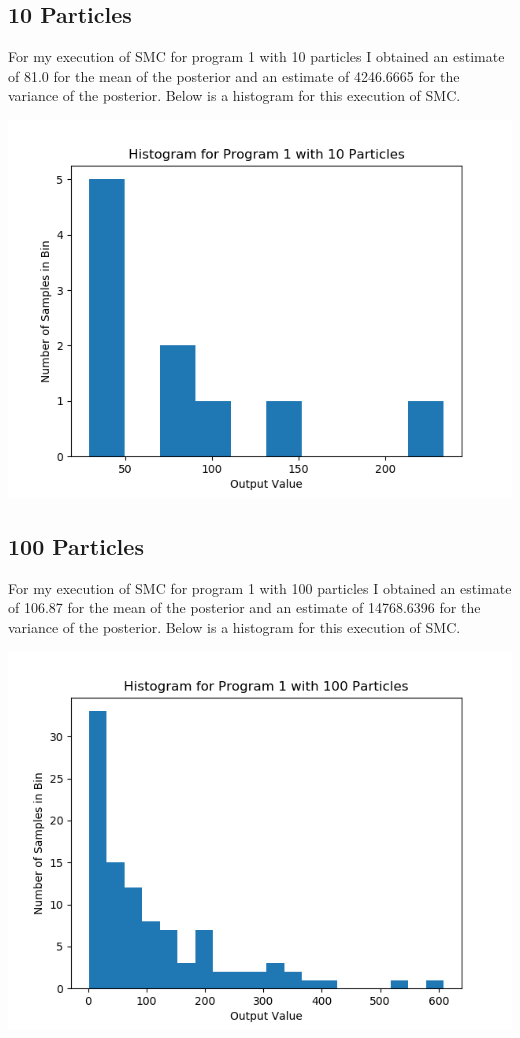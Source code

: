 \documentclass[11pt]{article}
\theoremstyle{definition}
\begin{document}
\subsection{10 Particles}

For my execution of SMC for program 1 with 10 particles I obtained an estimate of 81.0 for the mean of the posterior and an estimate of 4246.6665 for the variance of the posterior. Below is a histogram for this execution of SMC.

\begin{center}
\includegraphics[scale=0.5]{../plots/P1NP10.png}
\end{center}

\subsection{100 Particles}

For my execution of SMC for program 1 with 100 particles I obtained an estimate of 106.87 for the mean of the posterior and an estimate of 14768.6396 for the variance of the posterior. Below is a histogram for this execution of SMC.

\begin{center}
\includegraphics[scale=0.5]{../plots/P1NP100.png}
\end{center}
\end{document}
